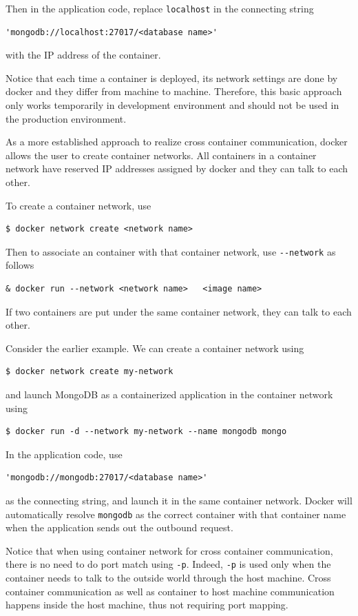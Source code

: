 Then in the application code, replace \verb|localhost| in the connecting string
\begin{lstlisting}
'mongodb://localhost:27017/<database name>'	
\end{lstlisting}
with the IP address of the container.

Notice that each time a container is deployed, its network settings are done by docker and they differ from machine to machine. Therefore, this basic approach only works temporarily in development environment and should not be used in the production environment.

As a more established approach to realize cross container communication, docker allows the user to create container networks. All containers in a container network have reserved IP addresses assigned by docker and they can talk to each other.

To create a container network, use
\begin{lstlisting}
$ docker network create <network name>
\end{lstlisting}
Then to associate an container with that container network, use \verb|--network| as follows
\begin{lstlisting}
& docker run --network <network name>	<image name>
\end{lstlisting}
If two containers are put under the same container network, they can talk to each other. 

Consider the earlier example. We can create a container network using
\begin{lstlisting}
$ docker network create my-network
\end{lstlisting}
and launch MongoDB as a containerized application in the container network using
\begin{lstlisting}
$ docker run -d --network my-network --name mongodb mongo
\end{lstlisting}
In the application code, use
\begin{lstlisting}
'mongodb://mongodb:27017/<database name>'	
\end{lstlisting}
as the connecting string, and launch it in the same container network. Docker will automatically resolve \verb|mongodb| as the correct container with that container name when the application sends out the outbound request.

Notice that when using container network for cross container communication, there is no need to do port match using \verb|-p|. Indeed, \verb|-p| is used only when the container needs to talk to the outside world through the host machine. Cross container communication as well as container to host machine communication happens inside the host machine, thus not requiring port mapping.

